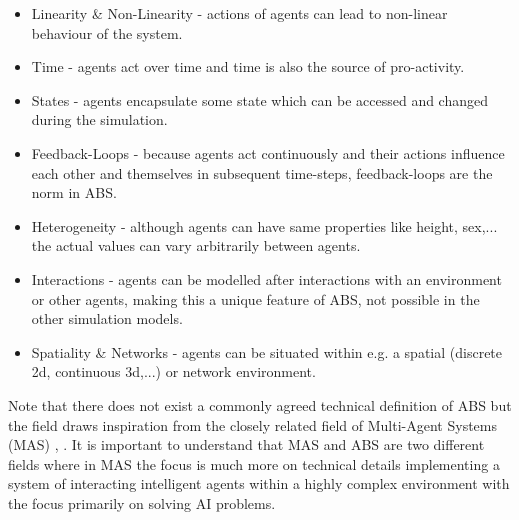 \begin{itemize}
	\item Linearity \& Non-Linearity - actions of agents can lead to non-linear behaviour of the system.
	\item Time - agents act over time and time is also the source of pro-activity.
	\item States - agents encapsulate some state which can be accessed and changed during the simulation.
	\item Feedback-Loops - because agents act continuously and their actions influence each other and themselves in subsequent time-steps, feedback-loops are the norm in ABS. 
	\item Heterogeneity - although agents can have same properties like height, sex,... the actual values can vary arbitrarily between agents.
	\item Interactions - agents can be modelled after interactions with an environment or other agents, making this a unique feature of ABS, not possible in the other simulation models.
	\item Spatiality \& Networks - agents can be situated within e.g. a spatial (discrete 2d, continuous 3d,...) or network environment. %
\end{itemize}

Note that there does not exist a commonly agreed technical definition of ABS but the field draws inspiration from the closely related field of Multi-Agent Systems (MAS) \cite{wooldridge_introduction_2009}, \cite{weiss_multiagent_2013}. It is important to understand that MAS and ABS are two different fields where in MAS the focus is much more on technical details implementing a system of interacting intelligent agents within a highly complex environment with the focus primarily on solving AI problems.

%
%
